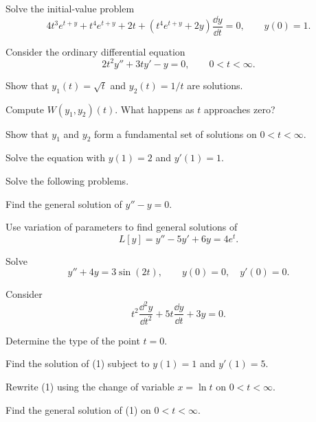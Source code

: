 \documentclass[11pt,oneside]{article}
\begin{document}
\begin{problem}
Solve the initial-value problem
\[
4t^3e^{t+y}+t^4e^{t+y}+2t+
\left(t^4e^{t+y}+2y\right)\frac{\dd y}{\dd t}=0,
\qquad y(0)=1.
\]
\end{problem}

\begin{problem}
Consider the ordinary differential equation
\[
2t^2y''+3ty'-y=0,\qquad 0<t<\infty.
\]
\begin{problemsubparts}
\item Show that $y_1(t)=\sqrt t$ and $y_2(t)=1/t$ are solutions.
\item Compute $W(y_1,y_2)(t)$. What happens as $t$ approaches zero?
\item Show that $y_1$ and $y_2$ form a fundamental set of solutions on $0<t<\infty$.
\item Solve the equation with $y(1)=2$ and $y'(1)=1$.
\end{problemsubparts}
\end{problem}

\begin{problem}
Solve the following problems.
\begin{problemsubparts}
\item Find the general solution of $y''-y=0$.
\item Use variation of parameters to find general solutions of
\[
L[y]=y''-5y'+6y=4e^t.
\]
\item Solve
\[
y''+4y=3\sin(2t),\qquad y(0)=0,\quad y'(0)=0.
\]
\end{problemsubparts}
\end{problem}

\begin{problem}
Consider
\[
t^2\frac{\dd^2y}{\dd t^2}+5t\frac{\dd y}{\dd t}+3y=0.\tag{1}
\]
\begin{problemsubparts}
\item Determine the type of the point $t=0$.
\item Find the solution of (1) subject to $y(1)=1$ and $y'(1)=5$.
\item Rewrite (1) using the change of variable $x=\ln t$ on $0<t<\infty$.
\item Find the general solution of (1) on $0<t<\infty$.
\end{problemsubparts}
\end{problem}
\end{document}
